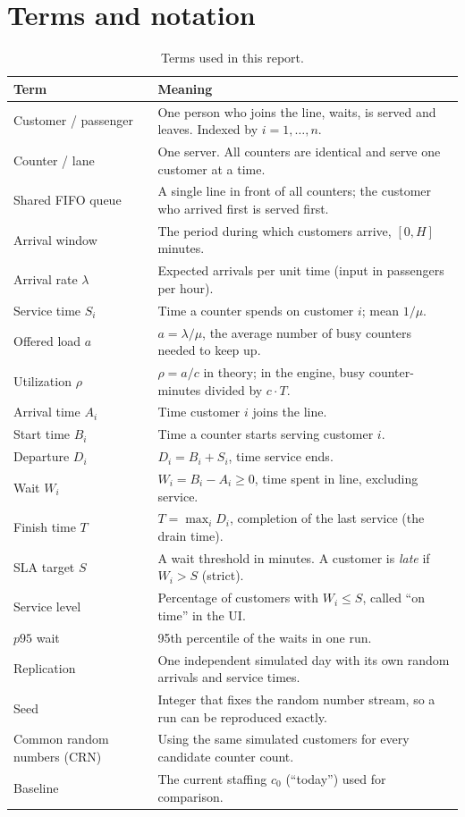 \documentclass[11pt,a4paper]{article}
\begin{document}
\section{Terms and notation}
\begin{table}[H]
\centering\small
\begin{tabularx}{\textwidth}{@{}l L@{}}
\toprule
Term & Meaning \\
\midrule
Customer / passenger & One person who joins the line, waits, is served and leaves. Indexed by $i=1,\dots,n$. \\
Counter / lane & One server. All counters are identical and serve one customer at a time. \\
Shared FIFO queue & A single line in front of all counters; the customer who arrived first is served first. \\
Arrival window & The period during which customers arrive, $[0, H]$ minutes. \\
Arrival rate $\lambda$ & Expected arrivals per unit time (input in passengers per hour). \\
Service time $S_i$ & Time a counter spends on customer $i$; mean $1/\mu$. \\
Offered load $a$ & $a=\lambda/\mu$, the average number of busy counters needed to keep up. \\
Utilization $\rho$ & $\rho = a/c$ in theory; in the engine, busy counter-minutes divided by $c\cdot T$. \\
Arrival time $A_i$ & Time customer $i$ joins the line. \\
Start time $B_i$ & Time a counter starts serving customer $i$. \\
Departure $D_i$ & $D_i=B_i+S_i$, time service ends. \\
Wait $W_i$ & $W_i = B_i - A_i \ge 0$, time spent in line, excluding service. \\
Finish time $T$ & $T=\max_i D_i$, completion of the last service (the drain time). \\
SLA target $S$ & A wait threshold in minutes. A customer is \emph{late} if $W_i > S$ (strict). \\
Service level & Percentage of customers with $W_i \le S$, called ``on time'' in the UI. \\
$p95$ wait & 95th percentile of the waits in one run. \\
Replication & One independent simulated day with its own random arrivals and service times. \\
Seed & Integer that fixes the random number stream, so a run can be reproduced exactly. \\
Common random numbers (CRN) & Using the same simulated customers for every candidate counter count. \\
Baseline & The current staffing $c_0$ (``today'') used for comparison. \\
\bottomrule
\end{tabularx}
\caption{Terms used in this report.}
\end{table}
\end{document}
